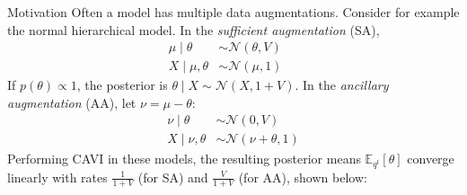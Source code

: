 \documentclass[final]{beamer}
\newlength{\onecolwid}
\begin{document}
\begin{frame}[t]
\begin{columns}[t]
\begin{column}{\onecolwid}
\begin{block}{Motivation}
Often a model has multiple data augmentations. Consider for example the normal hierarchical model. In the {\sl sufficient augmentation} (SA),
\begin{align*}
\mu \mid \theta
&\sim \mathcal N(\theta,V) ~~~\,\,\,\,\\
X\mid \mu,\theta
&\sim \mathcal N(\mu,1)
\end{align*}
If $p(\theta)\propto 1$, the posterior is $\theta\mid X \sim \mathcal N(X,1+V)$. In the {\sl ancillary augmentation} (AA), let $\nu=\mu-\theta$:
\begin{align*}
\nu \mid \theta
&\sim \mathcal N(0,V) \\
X\mid \nu,\theta
&\sim \mathcal N(\nu +\theta,1)
\end{align*}
Performing CAVI in these models, the resulting posterior means $\mathbb E_{q^t}[\theta]$ converge linearly with rates $\frac{1}{1+V}$ (for SA) and $\frac{V}{1+V}$ (for AA), shown below:   \vspace{.5em}


\end{block}
\end{column}
\end{columns}
\end{frame}
\end{document}
